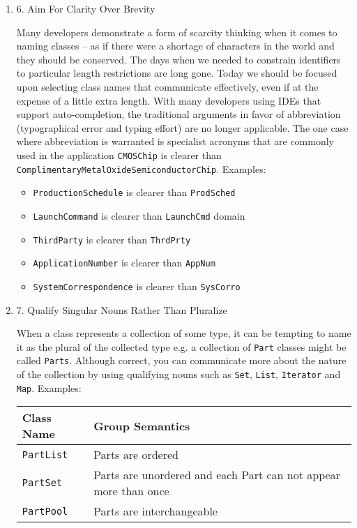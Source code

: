 \documentclass{article}
\begin{document}
\begin{enumerate}
\item 6. Aim For Clarity Over Brevity
\label{sec:orgheadline269}

Many developers demonstrate a form of scarcity thinking when it comes to
naming classes -- as if there were a shortage of characters in the world
and they should be conserved. The days when we needed to constrain
identifiers to particular length restrictions are long gone. Today we
should be focused upon selecting class names that communicate
effectively, even if at the expense of a little extra length. With many
developers using IDEs that support auto-completion, the traditional
arguments in favor of abbreviation (typographical error and typing
effort) are no longer applicable. The one case where abbreviation is
warranted is specialist acronyms that are commonly used in the
application \texttt{CMOSChip} is clearer than
\texttt{ComplimentaryMetalOxideSemiconductorChip}. Examples:

\begin{itemize}
\item \texttt{ProductionSchedule} is clearer than \texttt{ProdSched}
\item \texttt{LaunchCommand} is clearer than \texttt{LaunchCmd} domain
\item \texttt{ThirdParty} is clearer than \texttt{ThrdPrty}
\item \texttt{ApplicationNumber} is clearer than \texttt{AppNum}
\item \texttt{SystemCorrespondence} is clearer than \texttt{SysCorro}
\end{itemize}

\item 7. Qualify Singular Nouns Rather Than Pluralize
\label{sec:orgheadline270}

When a class represents a collection of some type, it can be tempting to
name it as the plural of the collected type e.g. a collection of \texttt{Part}
classes might be called \texttt{Parts}. Although correct, you can communicate
more about the nature of the collection by using qualifying nouns such
as \texttt{Set}, \texttt{List}, \texttt{Iterator} and \texttt{Map}. Examples:

\begin{center}
\begin{tabular}{ll}
Class Name & Group Semantics\\
\hline
\texttt{PartList} & Parts are ordered\\
\texttt{PartSet} & Parts are unordered and each Part can not appear more than once\\
\texttt{PartPool} & Parts are interchangeable\\
\end{tabular}
\end{center}


\end{enumerate}
\end{document}
